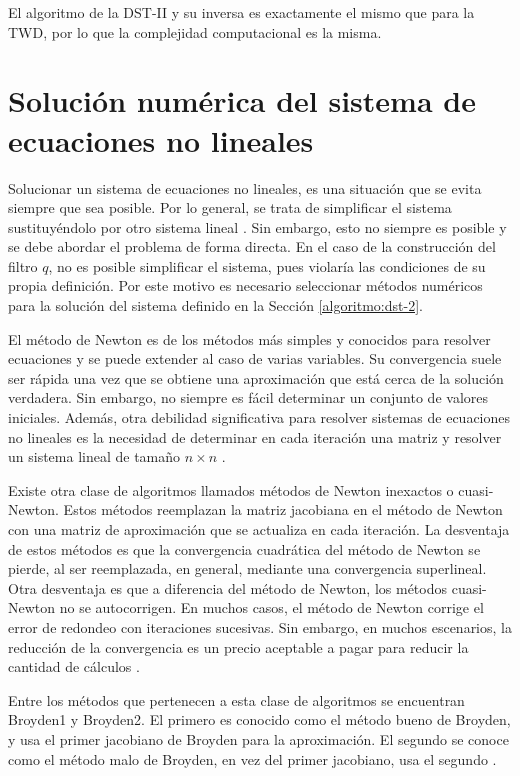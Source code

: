 El algoritmo de la DST-II y su inversa es exactamente el mismo que para la TWD, por lo que la complejidad computacional
es la misma.

\section{Solución numérica del sistema de ecuaciones no lineales}\label{numerical-solution}

Solucionar un sistema de ecuaciones no lineales, es una situación que se evita siempre que sea 
posible. Por lo general, se trata de simplificar el sistema sustituyéndolo por otro sistema 
lineal \cite{Burden2016}. Sin embargo, esto no siempre es posible y se debe abordar el problema de
forma directa. En el caso de la construcción del filtro $q$, no es posible simplificar el sistema, pues violaría
las condiciones de su propia definición. Por este motivo es necesario seleccionar métodos numéricos para la
solución del sistema definido en la Sección \ref{algoritmo:dst-2}.

El método de Newton es de los métodos más simples y conocidos para resolver ecuaciones y se 
puede extender al caso de varias
variables. Su convergencia suele ser rápida una vez que se obtiene una aproximación que está cerca de la solución
verdadera. Sin embargo, no siempre es fácil determinar un conjunto de valores iniciales. Además, otra debilidad
significativa para resolver sistemas de ecuaciones no lineales es la necesidad de determinar en cada iteración 
una matriz y resolver un sistema lineal de tamaño $n\times n$ \cite{Burden2016}. 

Existe otra clase de algoritmos llamados métodos de Newton inexactos o cuasi-Newton. Estos métodos reemplazan la
matriz jacobiana en el método de Newton con una matriz de aproximación que se actualiza en 
cada iteración. La desventaja de estos métodos es que la convergencia cuadrática del método de Newton se pierde,
al ser reemplazada, en general, mediante una convergencia superlineal. Otra desventaja es que a diferencia 
del método de Newton, los métodos cuasi-Newton no se autocorrigen. En muchos casos, el método de Newton
corrige el error de redondeo con iteraciones sucesivas. Sin embargo, en muchos escenarios, la reducción 
de la convergencia es un precio aceptable a pagar para reducir la cantidad de cálculos \cite{Burden2016}. 

Entre los métodos que pertenecen a esta clase de algoritmos se encuentran Broyden1 y Broyden2. El primero es conocido
como el método bueno de Broyden, y usa el primer jacobiano de Broyden para la aproximación. El segundo se conoce
como el método malo de Broyden, en vez del primer jacobiano, usa el segundo \cite{broyden}.

